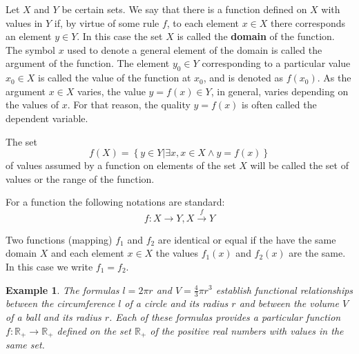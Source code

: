 \documentclass[a4paper,12pt]{article} %
\newtheorem{example}{Example}[section]
\begin{document}
Let $X$ and $Y$ be certain sets. We say that there is a function defined 
on $X$ with values in $Y$ if, by virtue of some rule $f$, to each element 
$x \in X$ there corresponds an element $y \in Y$. In this case the set $X$
is called the {\color{red} \textbf{domain}} of the function.
The symbol $x$ used to denote a general element of the domain is 
called the argument of the function. The element $y_0 \in Y$ corresponding 
to a particular value $x_0 \in X$ is called the value of the function 
at $x_0$, and is denoted as $f(x_0)$. As the argument $x \in X$ varies, the value
$y = f(x) \in Y$, in general, varies depending on the values of $x$.
For that reason, the quality $y = f(x)$ is often called the dependent 
variable.

The set 
\[
    f(X) = \left\{y \in Y \vert \exists x, x \in X \wedge y = f(x) \right\}
\]
of values assumed by a function on elements of the set $X$ will 
be called the set of values or the range of the function.

For a function the following notations are standard:
\[
    f: X \to Y,  X \xrightarrow{f} Y
    \]

Two functions (mapping) $f_1$ and $f_2$ are identical or equal 
if the have the same domain $X$ and each element $x \in X$ the values 
$f_1(x)$ and $f_2(x)$ are the same. In this case we write $f_1 = f_2$.

\begin{example}
    The formulas $l = 2\pi r$ and $V = \frac{4}{3}\pi r^3$ establish 
    functional relationships between the circumference $l$
    of a circle and its radius $r$ and between the volume $V$
    of a ball and its radius $r$. Each of these formulas provides 
    a particular function $f: \mathbb{R}_+ \to \mathbb{R}_+$
    defined on the set $\mathbb{R}_+$ of the positive real numbers 
    with values in the same set.
\end{example}
\end{document}
